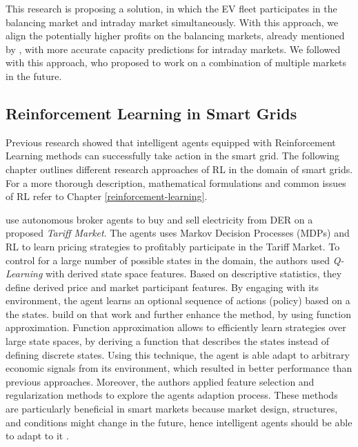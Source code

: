 \documentclass[12pt, article]{article}
\begin{document}
This research is proposing a solution, in which the EV fleet participates in the
balancing market and intraday market simultaneously. With this approach, we
align the potentially higher profits on the balancing markets, already mentioned
by \textcite{tomic07_using_fleet_elect_drive_vehic_grid_suppor}, with more
accurate capacity predictions for intraday markets. We followed
\textcite{kahlen17_fleet} with this approach, who proposed to work on a combination
of multiple markets in the future.

\subsection{Reinforcement Learning in Smart Grids}
\label{sec:org3d72fed}

Previous research showed that intelligent agents equipped with Reinforcement
Learning methods can successfully take action in the smart grid. The following
chapter outlines different research approaches of RL in the domain of smart
grids. For a more thorough description, mathematical formulations and common
issues of RL refer to Chapter \ref{reinforcement-learning}.

\textcite{reddy11_learn_behav_multip_auton_agent,reddy11_strat} use autonomous
broker agents to buy and sell electricity from DER on a proposed \emph{Tariff
Market}. The agents uses Markov Decision Processes (MDPs) and RL to learn pricing
strategies to profitably participate in the Tariff Market. To control for a
large number of possible states in the domain, the authors used \emph{Q-Learning}
with derived state space features. Based on descriptive statistics, they define
derived price and market participant features. By engaging with its
environment, the agent learns an optional sequence of actions (policy) based on
a the states. \textcite{peters13_reinf_learn_approac_to_auton} build on that work
and further enhance the method, by using function approximation. Function
approximation allows to efficiently learn strategies over large state spaces, by
deriving a function that describes the states instead of defining discrete
states. Using this technique, the agent is able adapt to arbitrary economic
signals from its environment, which resulted in better performance than previous
approaches. Moreover, the authors applied feature selection and regularization
methods to explore the agents adaption process. These methods are particularly
beneficial in smart markets because market design, structures, and conditions
might change in the future, hence intelligent agents should be able to adapt to
it \parencite{peters13_reinf_learn_approac_to_auton}.
\end{document}

